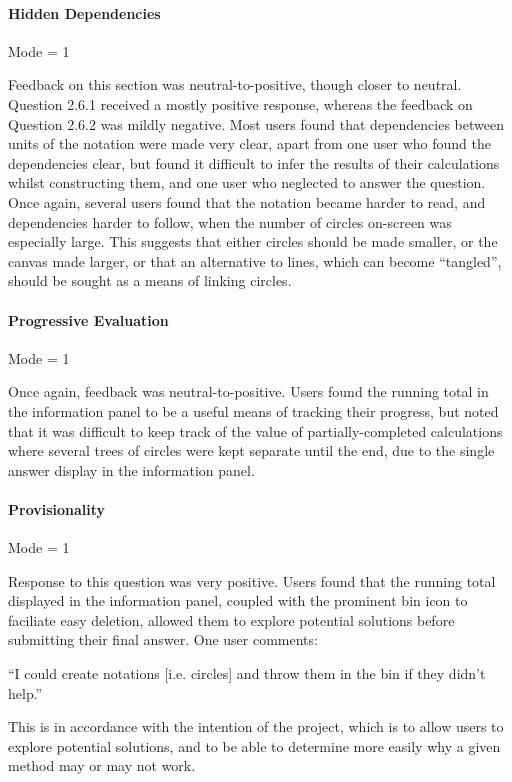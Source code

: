 \documentclass[12pt,twoside,notitlepage,xetex]{report}
\begin{document}
{\paragraph{Hidden Dependencies}\hfill

Mode = 1

Feedback on this section was neutral-to-positive, though closer to neutral.  Question 2.6.1 received a mostly positive response, whereas the feedback on Question 2.6.2 was mildly negative.  Most users found that dependencies between units of the notation were made very clear, apart from one user who found the dependencies clear, but found it difficult to infer the results of their calculations whilst constructing them, and one user who neglected to answer the question.  Once again, several users found that the notation became harder to read, and dependencies harder to follow, when the number of circles on-screen was especially large.  This suggests that either circles should be made smaller, or the canvas made larger, or that an alternative to lines, which can become ``tangled'', should be sought as a means of linking circles.

\paragraph{Progressive Evaluation}\hfill

Mode = 1

Once again, feedback was neutral-to-positive.  Users found the running total in the information panel to be a useful means of tracking their progress, but noted that it was difficult to keep track of the value of partially-completed calculations where several trees of circles were kept separate until the end, due to the single answer display in the information panel.

\paragraph{Provisionality}\hfill

Mode = 1

Response to this question was very positive.  Users found that the running total displayed in the information panel, coupled with the prominent bin icon to faciliate easy deletion, allowed them to explore potential solutions before submitting their final answer.  One user comments:
\begin{center}
\parbox[c]{\textwidth-2cm}{
\small
``I could create notations [i.e. circles] and throw them in the bin if they didn't help.''
}
\end{center}
This is in accordance with the intention of the project, which is to allow users to explore potential solutions, and to be able to determine more easily why a given method may or may not work.

}
\end{document}
